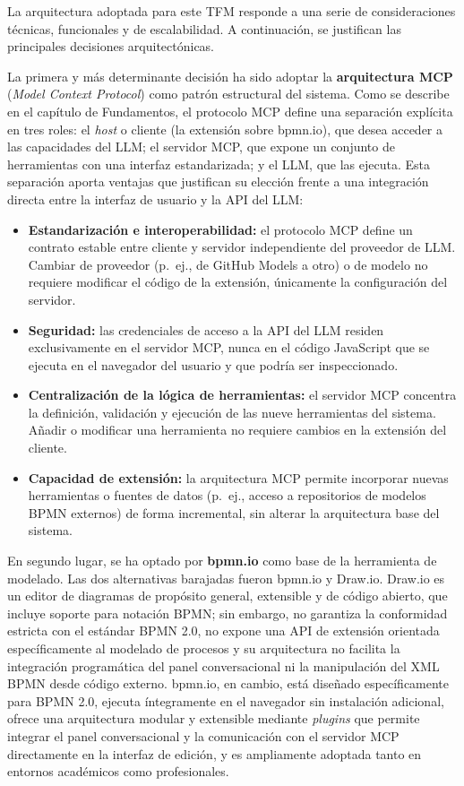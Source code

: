 La arquitectura adoptada para este TFM responde a una serie de consideraciones técnicas, funcionales y de escalabilidad. A continuación, se justifican las principales decisiones arquitectónicas.

La primera y más determinante decisión ha sido adoptar la \textbf{arquitectura MCP} (\textit{Model Context Protocol}) como patrón estructural del sistema. Como se describe en el capítulo de Fundamentos, el protocolo MCP define una separación explícita en tres roles: el \textit{host} o cliente (la extensión sobre bpmn.io), que desea acceder a las capacidades del LLM; el servidor MCP, que expone un conjunto de herramientas con una interfaz estandarizada; y el LLM, que las ejecuta. Esta separación aporta ventajas que justifican su elección frente a una integración directa entre la interfaz de usuario y la API del LLM:

\begin{itemize}
    \item[$\bullet$] \textbf{Estandarización e interoperabilidad:} el protocolo MCP define un contrato estable entre cliente y servidor independiente del proveedor de LLM. Cambiar de proveedor (p.~ej., de GitHub Models a otro) o de modelo no requiere modificar el código de la extensión, únicamente la configuración del servidor.
    \item[$\bullet$] \textbf{Seguridad:} las credenciales de acceso a la API del LLM residen exclusivamente en el servidor MCP, nunca en el código JavaScript que se ejecuta en el navegador del usuario y que podría ser inspeccionado.
    \item[$\bullet$] \textbf{Centralización de la lógica de herramientas:} el servidor MCP concentra la definición, validación y ejecución de las nueve herramientas del sistema. Añadir o modificar una herramienta no requiere cambios en la extensión del cliente.
    \item[$\bullet$] \textbf{Capacidad de extensión:} la arquitectura MCP permite incorporar nuevas herramientas o fuentes de datos (p.~ej., acceso a repositorios de modelos BPMN externos) de forma incremental, sin alterar la arquitectura base del sistema.
\end{itemize}

En segundo lugar, se ha optado por \textbf{bpmn.io} como base de la herramienta de modelado. Las dos alternativas barajadas fueron bpmn.io y Draw.io. Draw.io es un editor de diagramas de propósito general, extensible y de código abierto, que incluye soporte para notación BPMN; sin embargo, no garantiza la conformidad estricta con el estándar BPMN 2.0, no expone una API de extensión orientada específicamente al modelado de procesos y su arquitectura no facilita la integración programática del panel conversacional ni la manipulación del XML BPMN desde código externo. bpmn.io, en cambio, está diseñado específicamente para BPMN 2.0, ejecuta íntegramente en el navegador sin instalación adicional, ofrece una arquitectura modular y extensible mediante \textit{plugins} que permite integrar el panel conversacional y la comunicación con el servidor MCP directamente en la interfaz de edición, y es ampliamente adoptada tanto en entornos académicos como profesionales.

